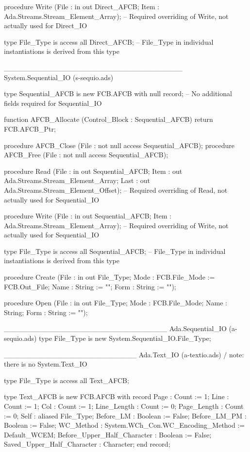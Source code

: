   procedure Write
     (File : in out Direct_AFCB;
      Item : Ada.Streams.Stream_Element_Array);
   --  Required overriding of Write, not actually used for Direct_IO

   type File_Type is access all Direct_AFCB;
   --  File_Type in individual instantiations is derived from this type

___________________________________
System.Sequential_IO (s-sequio.ads)

   type Sequential_AFCB is new FCB.AFCB with null record;
   --  No additional fields required for Sequential_IO

   function AFCB_Allocate
     (Control_Block : Sequential_AFCB) return FCB.AFCB_Ptr;

   procedure AFCB_Close (File : not null access Sequential_AFCB);
   procedure AFCB_Free  (File : not null access Sequential_AFCB);

   procedure Read
     (File : in out Sequential_AFCB;
      Item : out Ada.Streams.Stream_Element_Array;
      Last : out Ada.Streams.Stream_Element_Offset);
   --  Required overriding of Read, not actually used for Sequential_IO

   procedure Write
     (File : in out Sequential_AFCB;
      Item : Ada.Streams.Stream_Element_Array);
   --  Required overriding of Write, not actually used for Sequential_IO

   type File_Type is access all Sequential_AFCB;
   --  File_Type in individual instantiations is derived from this type

   procedure Create
     (File : in out File_Type;
      Mode : FCB.File_Mode := FCB.Out_File;
      Name : String := "";
      Form : String := "");

   procedure Open
     (File : in out File_Type;
      Mode : FCB.File_Mode;
      Name : String;
      Form : String := "");

________________________________
Ada.Sequential_IO (a-sequio.ads)
   type File_Type is new System.Sequential_IO.File_Type;

__________________________
Ada.Text_IO (a-textio.ads) / note: there is no System.Text_IO

   type File_Type is access all Text_AFCB;

   type Text_AFCB is new FCB.AFCB with record
      Page        : Count := 1;
      Line        : Count := 1;
      Col         : Count := 1;
      Line_Length : Count := 0;
      Page_Length : Count := 0;
      Self : aliased File_Type;
      Before_LM : Boolean := False;
      Before_LM_PM : Boolean := False;
      WC_Method : System.WCh_Con.WC_Encoding_Method := Default_WCEM;
      Before_Upper_Half_Character : Boolean := False;
      Saved_Upper_Half_Character : Character;
   end record;

